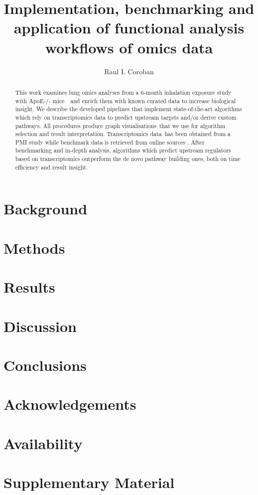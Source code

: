 \documentclass{jot}
\title{Implementation, benchmarking and application of functional analysis workflows of omics data}
\author[affiliation=orgname, nowrap] %
    {Raul I. Coroban}
    {is ...
    Contact him at \email{r.coroban@student.vu.nl}}
\begin{document}
\begin{abstract}
This work examines lung omics analyses from a 6-month inhalation exposure study with ApoE-/- mice  and enrich them with known curated data to increase biological insight. We describe the developed pipelines that implement state-of-the-art algorithms which rely on transcriptomics data to predict upstream targets and/or derive custom pathways. All procedures produce graph visualisations that we use for algorithm selection and result interpretation. Transcriptomics data has been obtained from a PMI study \cite{Titz2020Multi-omicsSmoke} while benchmark data is retrieved from online sources \cite{Wang2020TherapeuticTherapeutics} \cite{Subramanian2017AProfiles}. After benchmarking and in-depth analysis, algorithms which predict upstream regulators based on transcriptomics outperform the de novo pathway building ones, both on time efficiency and result insight.
\end{abstract}


\section{Background}
\label{section:background}


\section{Methods}
\label{section:methods}


\section{Results}
\label{section:results}


\section{Discussion}
\label{section:discussion}


\section{Conclusions}
\label{section:conclusions}


\section{Acknowledgements}


\section{Availability}







\newpage
\appendix
\section{Supplementary Material}

\end{document}
